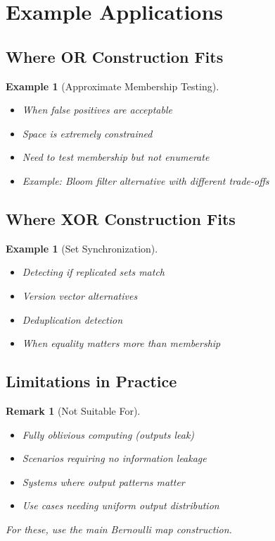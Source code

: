 \documentclass[11pt,final]{article}
\newtheorem{example}[theorem]{Example}
\newtheorem{remark}[theorem]{Remark}
\begin{document}
\section{Example Applications}

\subsection{Where OR Construction Fits}

\begin{example}[Approximate Membership Testing]
\begin{itemize}
    \item When false positives are acceptable
    \item Space is extremely constrained
    \item Need to test membership but not enumerate
    \item Example: Bloom filter alternative with different trade-offs
\end{itemize}
\end{example}

\subsection{Where XOR Construction Fits}

\begin{example}[Set Synchronization]
\begin{itemize}
    \item Detecting if replicated sets match
    \item Version vector alternatives
    \item Deduplication detection
    \item When equality matters more than membership
\end{itemize}
\end{example}

\subsection{Limitations in Practice}

\begin{remark}[Not Suitable For]
\begin{itemize}
    \item Fully oblivious computing (outputs leak)
    \item Scenarios requiring no information leakage
    \item Systems where output patterns matter
    \item Use cases needing uniform output distribution
\end{itemize}
For these, use the main Bernoulli map construction.
\end{remark}
\end{document}
